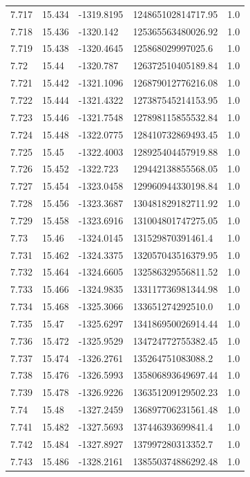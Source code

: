 \begin{tabular}{lllll}
7.717 & 15.434 & -1319.8195 & 124865102814717.95 & 1.0 \\
7.718 & 15.436 & -1320.142 & 125365563480026.92 & 1.0 \\
7.719 & 15.438 & -1320.4645 & 125868029997025.6 & 1.0 \\
7.72 & 15.44 & -1320.787 & 126372510405189.84 & 1.0 \\
7.721 & 15.442 & -1321.1096 & 126879012776216.08 & 1.0 \\
7.722 & 15.444 & -1321.4322 & 127387545214153.95 & 1.0 \\
7.723 & 15.446 & -1321.7548 & 127898115855532.84 & 1.0 \\
7.724 & 15.448 & -1322.0775 & 128410732869493.45 & 1.0 \\
7.725 & 15.45 & -1322.4003 & 128925404457919.88 & 1.0 \\
7.726 & 15.452 & -1322.723 & 129442138855568.05 & 1.0 \\
7.727 & 15.454 & -1323.0458 & 129960944330198.84 & 1.0 \\
7.728 & 15.456 & -1323.3687 & 130481829182711.92 & 1.0 \\
7.729 & 15.458 & -1323.6916 & 131004801747275.05 & 1.0 \\
7.73 & 15.46 & -1324.0145 & 131529870391461.4 & 1.0 \\
7.731 & 15.462 & -1324.3375 & 132057043516379.95 & 1.0 \\
7.732 & 15.464 & -1324.6605 & 132586329556811.52 & 1.0 \\
7.733 & 15.466 & -1324.9835 & 133117736981344.98 & 1.0 \\
7.734 & 15.468 & -1325.3066 & 133651274292510.0 & 1.0 \\
7.735 & 15.47 & -1325.6297 & 134186950026914.44 & 1.0 \\
7.736 & 15.472 & -1325.9529 & 134724772755382.45 & 1.0 \\
7.737 & 15.474 & -1326.2761 & 135264751083088.2 & 1.0 \\
7.738 & 15.476 & -1326.5993 & 135806893649697.44 & 1.0 \\
7.739 & 15.478 & -1326.9226 & 136351209129502.23 & 1.0 \\
7.74 & 15.48 & -1327.2459 & 136897706231561.48 & 1.0 \\
7.741 & 15.482 & -1327.5693 & 137446393699841.4 & 1.0 \\
7.742 & 15.484 & -1327.8927 & 137997280313352.7 & 1.0 \\
7.743 & 15.486 & -1328.2161 & 138550374886292.48 & 1.0 \\

\end{tabular}
